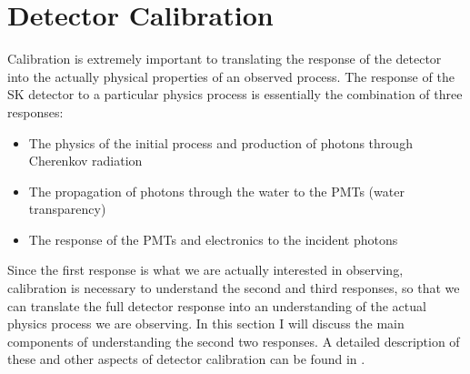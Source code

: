 \section{Detector Calibration}
\label{sec:calibration}
Calibration is extremely important to translating the response of the detector into the actually physical properties of an observed process.  The response of the SK detector to a particular physics process is essentially the combination of three responses:
\begin{itemize}
\item The physics of the initial process and production of photons through Cherenkov radiation
\item The propagation of photons through the water to the PMTs (water transparency)
\item  The response of the PMTs and electronics to the incident photons
\end{itemize}
Since the first response is what we are actually interested in observing, calibration is necessary to understand the second and third responses, so that we can translate the full detector response into an understanding of the actual physics process we are observing.  In this section I will discuss the main components of understanding the second two responses.  A detailed description of these and other aspects of detector calibration can be found in \cite{Abe:2013gga}.

